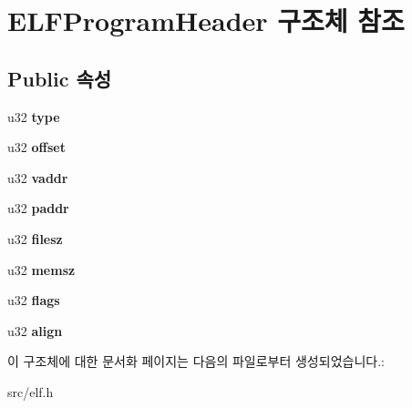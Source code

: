 \hypertarget{struct_e_l_f_program_header}{}\section{E\+L\+F\+Program\+Header 구조체 참조}
\label{struct_e_l_f_program_header}
\subsection*{Public 속성}
\begin{DoxyCompactItemize}
\item 
\mbox{\label{struct_e_l_f_program_header_af6f8a937522c04b854720ce9123feb39}} 
u32 {\bfseries type}
\item 
\mbox{\label{struct_e_l_f_program_header_ad5321e73c13a67e6b8ff192718c49ef8}} 
u32 {\bfseries offset}
\item 
\mbox{\label{struct_e_l_f_program_header_a7185e6711867b15d2d2dd04666d8838f}} 
u32 {\bfseries vaddr}
\item 
\mbox{\label{struct_e_l_f_program_header_af64562e4f23abc28184c74b37125fa6c}} 
u32 {\bfseries paddr}
\item 
\mbox{\label{struct_e_l_f_program_header_aa74d6e39126edabc460116b7e2693469}} 
u32 {\bfseries filesz}
\item 
\mbox{\label{struct_e_l_f_program_header_a501661133d3a1c9f9d11cd4dd582d626}} 
u32 {\bfseries memsz}
\item 
\mbox{\label{struct_e_l_f_program_header_a6e404410651c4610349928dc4dbe8a0f}} 
u32 {\bfseries flags}
\item 
\mbox{\label{struct_e_l_f_program_header_a202b13684dfefe12c5d43709a3620698}} 
u32 {\bfseries align}
\end{DoxyCompactItemize}


이 구조체에 대한 문서화 페이지는 다음의 파일로부터 생성되었습니다.\+:\begin{DoxyCompactItemize}
\item 
src/elf.\+h\end{DoxyCompactItemize}
